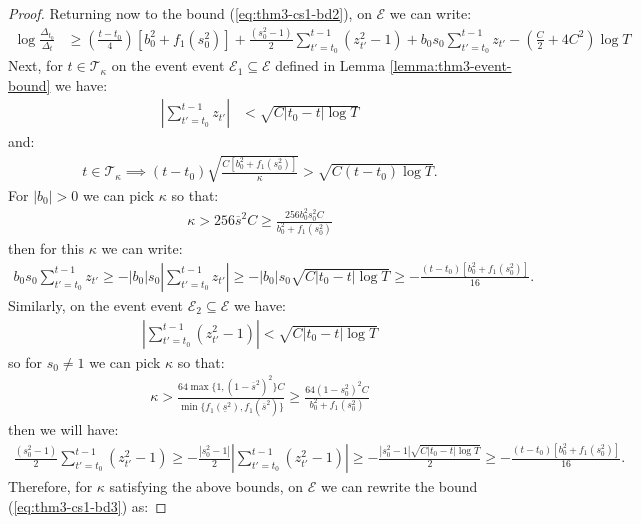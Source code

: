 \begin{proof}
Returning now to the bound (\ref{eq:thm3-cs1-bd2}), on $\mathcal{E}$ we can write:
\begin{align}
    \log \frac{\Delta_{t_0}}{\Delta_t} &\geq \left(\frac{t-t_0}{4}\right)\left[b_0^2 + f_1(s_0^2)\right] + \frac{(s_0^2-1)}{2} \sum_{t' = t_0}^{t - 1} (z_{t'}^2-1) + b_0 s_0 \sum_{t' = t_0}^{t - 1} z_{t'} - \left(\frac{C}{2} + 4C^2\right)\log T  \label{eq:thm3-cs1-bd3}
\end{align}
Next, for $t\in\mathcal{T}_\kappa$ on the event event $\mathcal{E}_1 \subseteq\mathcal{E}$ defined in Lemma \ref{lemma:thm3-event-bound} we have:
\begin{align*}
    \left|\sum_{t' = t_0}^{t - 1} z_{t'}\right| &< \sqrt{C|t_0 - t|\log T}
\end{align*}
and:
\begin{align*}
     t \in \mathcal{T}_{\kappa} \implies (t - t_0)\sqrt{\frac{C[b_0^2 + f_1(s_0^2)]}{\kappa}} > \sqrt{C (t - t_0)\log T}.
\end{align*}
For $|b_0| > 0$ we can pick $\kappa$ so that:
\begin{align*}
    \kappa >  256 \overline{s}^2 C \geq \frac{256 b_0^2s_0^2 C}{b_0^2 + f_1(s_0^2)}
\end{align*}
then for this $\kappa$ we can write:
\begin{align*}
    b_0s_0 \sum_{t' = t_0}^{t - 1} z_{t'} \geq - |b_0| s_0 \left|\sum_{t' = t_0}^{t - 1} z_{t'}\right| \geq - |b_0|s_0\sqrt{C|t_0 - t|\log T}  \geq - \frac{(t-t_0)[b_0^2 + f_1(s_0^2)]}{16}.
\end{align*}
Similarly, on the event event $\mathcal{E}_2 \subseteq \mathcal{E}$ we have:
\begin{align*}
     \left|\sum_{t' = t_0}^{t - 1} (z^2_{t'}-1)\right| <\sqrt{C|t_0 - t|\log T}
\end{align*}
so for $s_0\neq 1$ we can pick $\kappa$ so that:
\begin{align*}
    \kappa >  \frac{64 \max\{1,(1 -\overline{s}^2)^2\} C}{\min\{f_1(\underline{s}^2), f_1(\overline{s}^2)\}} \geq \frac{64 (1 -s_0^2)^2 C}{b_0^2 + f_1(s_0^2)}
\end{align*}
then we will have:
\small
\begin{align*}
      \frac{(s_0^2-1)}{2} \sum_{t' = t_0}^{t - 1} (z_{t'}^2-1) \geq -\frac{|s_0^2-1|}{2} \left|\sum_{t' = t_0}^{t - 1} (z_{t'}^2-1)\right| \geq -\frac{|s_0^2-1|\sqrt{C|t_0 - t|\log T}}{2} \geq - \frac{(t-t_0)[b_0^2 + f_1(s_0^2)]}{16}. 
\end{align*}
\normalsize
Therefore, for $\kappa$ satisfying the above bounds, on $\mathcal{E}$ we can rewrite the bound (\ref{eq:thm3-cs1-bd3}) as:

\end{proof}
